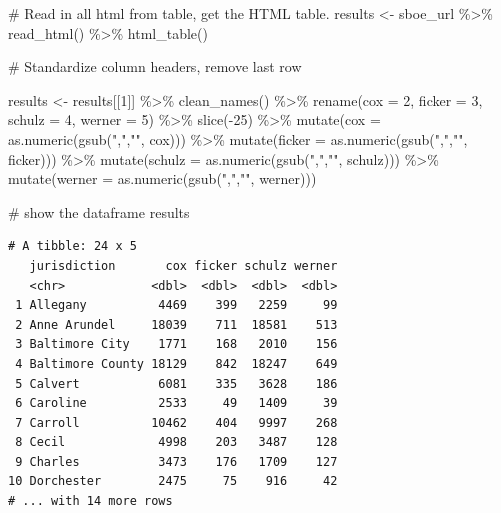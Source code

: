 \documentclass[
  letterpaper,
  DIV=11,
  numbers=noendperiod]{scrreprt}
\newenvironment{Shaded}{\begin{snugshade}}{\end{snugshade}}
\newcommand{\AttributeTok}[1]{\textcolor[rgb]{0.40,0.45,0.13}{#1}}
\newcommand{\CommentTok}[1]{\textcolor[rgb]{0.37,0.37,0.37}{#1}}
\newcommand{\DecValTok}[1]{\textcolor[rgb]{0.68,0.00,0.00}{#1}}
\newcommand{\FunctionTok}[1]{\textcolor[rgb]{0.28,0.35,0.67}{#1}}
\newcommand{\NormalTok}[1]{\textcolor[rgb]{0.00,0.23,0.31}{#1}}
\newcommand{\OtherTok}[1]{\textcolor[rgb]{0.00,0.23,0.31}{#1}}
\newcommand{\SpecialCharTok}[1]{\textcolor[rgb]{0.37,0.37,0.37}{#1}}
\newcommand{\StringTok}[1]{\textcolor[rgb]{0.13,0.47,0.30}{#1}}
\begin{document}
\begin{Shaded}
\begin{Highlighting}[]
\CommentTok{\# Read in all html from table, get the HTML table.}
\NormalTok{results }\OtherTok{\textless{}{-}}\NormalTok{ sboe\_url }\SpecialCharTok{\%\textgreater{}\%}
  \FunctionTok{read\_html}\NormalTok{() }\SpecialCharTok{\%\textgreater{}\%}
  \FunctionTok{html\_table}\NormalTok{()}

\CommentTok{\# Standardize column headers, remove last row}

\NormalTok{results }\OtherTok{\textless{}{-}}\NormalTok{ results[[}\DecValTok{1}\NormalTok{]] }\SpecialCharTok{\%\textgreater{}\%}
  \FunctionTok{clean\_names}\NormalTok{() }\SpecialCharTok{\%\textgreater{}\%}
  \FunctionTok{rename}\NormalTok{(}\AttributeTok{cox =} \DecValTok{2}\NormalTok{, }\AttributeTok{ficker =} \DecValTok{3}\NormalTok{, }\AttributeTok{schulz =} \DecValTok{4}\NormalTok{, }\AttributeTok{werner =} \DecValTok{5}\NormalTok{) }\SpecialCharTok{\%\textgreater{}\%}
  \FunctionTok{slice}\NormalTok{(}\SpecialCharTok{{-}}\DecValTok{25}\NormalTok{) }\SpecialCharTok{\%\textgreater{}\%}
  \FunctionTok{mutate}\NormalTok{(}\AttributeTok{cox =} \FunctionTok{as.numeric}\NormalTok{(}\FunctionTok{gsub}\NormalTok{(}\StringTok{","}\NormalTok{,}\StringTok{""}\NormalTok{, cox))) }\SpecialCharTok{\%\textgreater{}\%}
  \FunctionTok{mutate}\NormalTok{(}\AttributeTok{ficker =} \FunctionTok{as.numeric}\NormalTok{(}\FunctionTok{gsub}\NormalTok{(}\StringTok{","}\NormalTok{,}\StringTok{""}\NormalTok{, ficker))) }\SpecialCharTok{\%\textgreater{}\%}
  \FunctionTok{mutate}\NormalTok{(}\AttributeTok{schulz =} \FunctionTok{as.numeric}\NormalTok{(}\FunctionTok{gsub}\NormalTok{(}\StringTok{","}\NormalTok{,}\StringTok{""}\NormalTok{, schulz))) }\SpecialCharTok{\%\textgreater{}\%}
  \FunctionTok{mutate}\NormalTok{(}\AttributeTok{werner =} \FunctionTok{as.numeric}\NormalTok{(}\FunctionTok{gsub}\NormalTok{(}\StringTok{","}\NormalTok{,}\StringTok{""}\NormalTok{, werner)))}


\CommentTok{\# show the dataframe}
\NormalTok{results}
\end{Highlighting}
\end{Shaded}

\begin{verbatim}
# A tibble: 24 x 5
   jurisdiction       cox ficker schulz werner
   <chr>            <dbl>  <dbl>  <dbl>  <dbl>
 1 Allegany          4469    399   2259     99
 2 Anne Arundel     18039    711  18581    513
 3 Baltimore City    1771    168   2010    156
 4 Baltimore County 18129    842  18247    649
 5 Calvert           6081    335   3628    186
 6 Caroline          2533     49   1409     39
 7 Carroll          10462    404   9997    268
 8 Cecil             4998    203   3487    128
 9 Charles           3473    176   1709    127
10 Dorchester        2475     75    916     42
# ... with 14 more rows
\end{verbatim}
\end{document}
